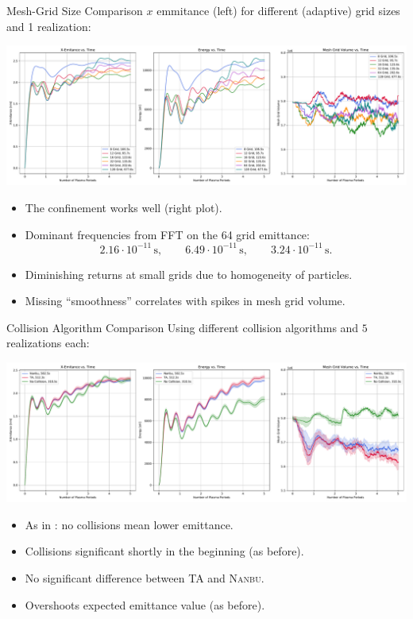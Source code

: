 \begin{frame}{Mesh-Grid Size Comparison}
    $x$ emmitance (left) for different (adaptive) grid sizes and 1 realization:
    \begin{minipage}{\textwidth}
        \centering
        \includegraphics[width=\textwidth]{ressources/test3/cold_sphere_grid_comparison.pdf}
    \end{minipage}
    \begin{itemize}
        \item The confinement works well (right plot).
        \item Dominant frequencies from FFT on the 64 grid emittance:
        $$
        2.16\cdot 10^{-11}\,\si{\second},
        \qquad 6.49\cdot 10^{-11}\,\si{\second},
        \qquad 3.24\cdot 10^{-11}\,\si{\second} .
        $$
        \item Diminishing returns at small grids due to homogeneity of particles.
        \item Missing ``smoothness'' correlates with spikes in mesh grid volume. %
    \end{itemize}
\end{frame}

\begin{frame}{Collision Algorithm Comparison}
    Using different collision algorithms and $5$ realizations each:
    \begin{minipage}{\textwidth}
        \centering
        \includegraphics[width=\textwidth]{ressources/test3/cold_sphere_collision_algo_comparison.pdf}
    \end{minipage}
    \begin{itemize}
        \item As in \cite[595]{Mitchell2015}: no collisions mean lower emittance.
        \item Collisions significant shortly in the beginning (as before).
        \item No significant difference between TA and \textsc{Nanbu}.
        \item Overshoots expected emittance value (as before).
    \end{itemize}
\end{frame}


